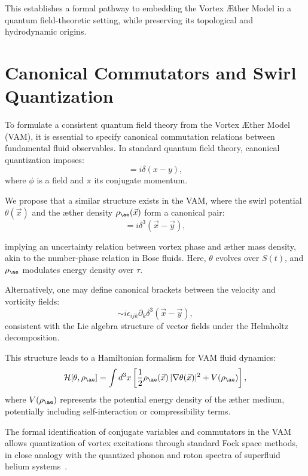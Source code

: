 \documentclass[12pt]{article}
\begin{document}
This establishes a formal pathway to embedding the Vortex \AE{}ther Model in a quantum field-theoretic setting, while preserving its topological and hydrodynamic origins.


\section{Canonical Commutators and Swirl Quantization}

To formulate a consistent quantum field theory from the Vortex \AE{}ther Model (VAM), it is essential to specify canonical commutation relations between fundamental fluid observables. In standard quantum field theory, canonical quantization imposes:
\begin{equation}
[\phi(x), \pi(y)] = i \delta(x - y),
\end{equation}
where $\phi$ is a field and $\pi$ its conjugate momentum.

We propose that a similar structure exists in the VAM, where the swirl potential $\theta(\vec{x})$ and the \ae{}ther density $\rho_{\ae}(\vec{x})$ form a canonical pair:
\begin{equation}
[\theta(\vec{x}), \rho_{\ae}(\vec{y})] = i \delta^3(\vec{x} - \vec{y}),
\end{equation}

implying an uncertainty relation between vortex phase and \ae{}ther mass density, akin to the number-phase relation in Bose fluids. Here, $\theta$ evolves over $S(t)$, and $\rho_{\ae}$ modulates energy density over $\tau$.

Alternatively, one may define canonical brackets between the velocity and vorticity fields:
\begin{equation}
[v_i(\vec{x}), \omega_j(\vec{y})] \sim i \epsilon_{ijk} \partial_k \delta^3(\vec{x} - \vec{y}),
\end{equation}
consistent with the Lie algebra structure of vector fields under the Helmholtz decomposition.

This structure leads to a Hamiltonian formalism for VAM fluid dynamics:
\begin{equation}
\mathcal{H}[\theta, \rho_{\ae}] = \int d^3x \left[ \frac{1}{2} \rho_{\ae}(\vec{x})\, |\nabla \theta(\vec{x})|^2 + V(\rho_{\ae}) \right],
\end{equation}
where $V(\rho_{\ae})$ represents the potential energy density of the \ae{}ther medium, potentially including self-interaction or compressibility terms.

The formal identification of conjugate variables and commutators in the VAM allows quantization of vortex excitations through standard Fock space methods, in close analogy with the quantized phonon and roton spectra of superfluid helium systems~\cite{fetter1971nonuniform, stone2000superfluidity, verlinde2021qft}.
\end{document}
